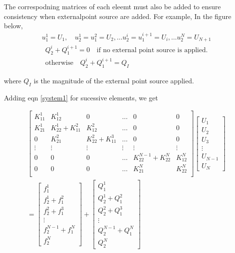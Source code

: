 The correspodning matrices of each eleemt must also be added to ensure consistency when externalpoint source are added.
For example,
In the figure below,
\begin{eqnarray}
	u_1^1 = U_1 , \quad	u_2^1 = u_1^2 =  U_2,  \dots 	u_2^i = u_1^{i+1} =  U_i , \dots u_2^N = U_{N+1}
\end{eqnarray}
\begin{eqnarray}
	Q_2^i + Q_1^{i+1} = 0 \quad \text{if no external point source is applied.}\\ \text{otherwise} \quad
	Q_2^i + Q_1^{i+1} = Q_I 
\end{eqnarray}

where $Q_I$ is the magnitude of the external point source applied.

Adding eqn \ref{system1} for sucessive elements, we get


\begin{eqnarray*}
\begin{bmatrix}
		K_{11}^1 & K_{12}^1 & 0 & \dots & 0 & 0 \\
		K_{21}^1 & K_{22}^1 + K_{11}^2 & K_{12}^2 & \dots & 0 & 0 \\
		0 & K_{21}^2 & K_{22}^2 + K_{11}^3 & \dots& 0 & 0 \\
		\vdots & \vdots & \vdots & \vdots & \vdots & \vdots \\
		0 &0 & 0 & \dots & K_{22}^{N-1} + K_{22}^N & K_{12}^N \\
		0 & 0 & 0 & \dots & K_{21}^N & K_{22}^N \\
\end{bmatrix}
\begin{bmatrix}
	U_1 \\
	U_2 \\
	U_3 \\
	\vdots \\
	U_{N-1} \\
	U_N
\end{bmatrix}\\=
\begin{bmatrix}
	f_1^1 \\
	f_2^1 + f_1^2\\
	f_2^2 + f_1^3\\
	\vdots \\
	f_2^{N-1} + f_1^N \\
	f_2^N
\end{bmatrix} +
\begin{bmatrix}
	Q_1^1 \\
	Q_2^1 + Q_1^2\\
	Q_2^2 + Q_1^3\\
	\vdots \\
	Q_2^{N-1} + Q_1^N \\
	Q_2^N
\end{bmatrix} 
\end{eqnarray*}

